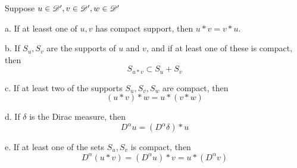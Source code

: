 \begin{theorem}
    Suppose $u \in \mathscr{D}', v\in \mathscr{D}', w\in \mathscr{D}'$\par
    a. If at leasst one of $u,v$ has compact support, then $u*v = v*u$.\par
    b. If $S_u, S_v$ are the supports of $u$ and $v$, and if at least one of these is compact, then
    \[S_{u*v} \subset S_u + S_v\]\par
    c. If at least two of the supports $S_u,S_v,S_w$ are compact, then
    \[(u*v)*w = u*(v*w)\]\par
    d. If $\delta$ is the Dirac measure, then
    \[
    D^{\alpha}u = (D^{\alpha}\delta)*u
    \]\par
    e. If at least one of the sets $S_u,S_v$ is compact, then
    \[D^{\alpha}(u*v) = (D^{\alpha}u)*v = u*(D^{\alpha} v)\]
\end{theorem}
